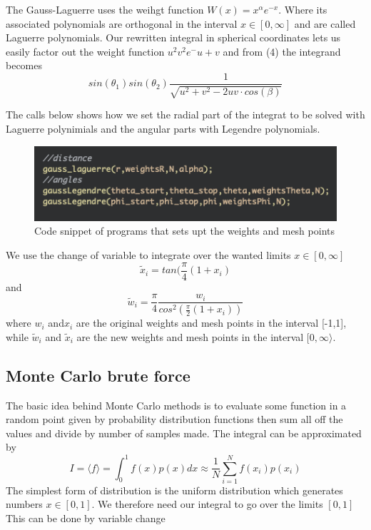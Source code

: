 \documentclass[twoside,twocolumn]{article}
\begin{document}
The Gauss-Laguerre uses the weihgt function $W(x)  = x^\alpha e^{-x}$. Where its associated polynomials are orthogonal in the interval $x\in[0,\infty]$ and are called Laguerre polynomials. Our rewritten integral in spherical coordinates lets us easily factor out the weight function $u^2v^2 e^-{u+v}$ and from (4) the integrand becomes
\begin{equation}
sin(\theta_1)sin(\theta_2)\frac{1}{\sqrt{u^2+v^2-2uv \cdot cos(\beta)}}
\end{equation}

The calls below shows how we set the radial part of the integrat to be solved with Laguerre polynimials and the angular parts with Legendre polynomials.
\begin{figure}[h]
\center
\includegraphics[scale=0.55]{Laguerre.png}
\caption{Code snippet of programs that sets upt the weights and mesh points}
\end{figure}

We use the change of variable to integrate over the wanted limits $x\in[0,\infty]$
\begin{equation}
	\tilde{x}_i = tan(\frac{\pi}{4}(1+x_i)
\end{equation}
and
\begin{equation}
	\tilde{w}_i = \frac{\pi}{4}\frac{w_i}{cos^2({\frac{\pi}{2}(1+x_i)})}
\end{equation}
where $w_i$ and$x_i$ are the original weights and mesh points in the interval [-1,1], while $\tilde{w}_i$ and $\tilde{x}_i$ are the new weights and mesh points in the interval $[0,\infty\rangle$.

\subsection{Monte Carlo brute force}

The basic idea behind Monte Carlo methods is to evaluate some function in a random point given by probability distribution functions then sum all off the values and divide by number of samples made. The integral can be approximated by
\begin{equation}
I = \langle f \rangle = \int_{0}^{1}f(x)p(x)dx \approx \frac{1}{N}\sum_{i=1}^{N} f(x_i)p(x_i)
\end{equation}
The simplest form of distribution is the uniform distribution which generates numbers $x\in [0,1]$. We therefore need our integral to go over the limits $[0,1]$ This can be done by variable change
\end{document}
